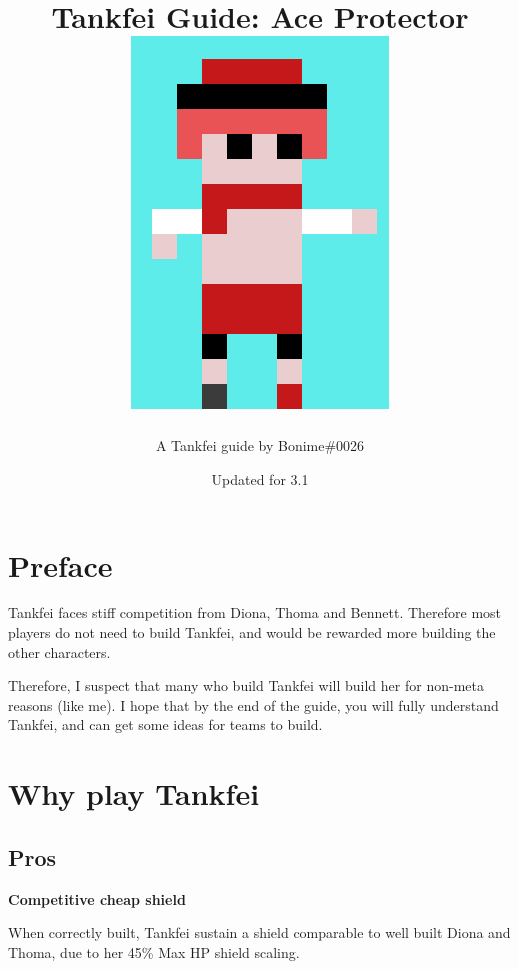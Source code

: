 \documentclass[11pt]{article}
\begin{document}
\title{Tankfei Guide: Ace Protector \vfill \includegraphics[scale= 1.45 ]{YanfeiPixel.png} \vfill
}
\author{A Tankfei guide by Bonime\#0026}
\date{Updated for 3.1}
\maketitle
\newpage
\tableofcontents
\newpage 
\section{Preface}

Tankfei faces stiff competition from Diona, Thoma and Bennett. Therefore most players do not need to build Tankfei, and would be rewarded more building the other characters.

Therefore, I suspect that many who build Tankfei will build her for non-meta reasons (like me). I hope that by the end of the guide, you will fully understand Tankfei, and can get some ideas for teams to build. 

\section{Why play Tankfei} 

\subsection{Pros}

\textbf{Competitive cheap shield}

When correctly built, Tankfei sustain a shield comparable to well built Diona and Thoma, due to her 45\% Max HP shield scaling. 
\end{document}
